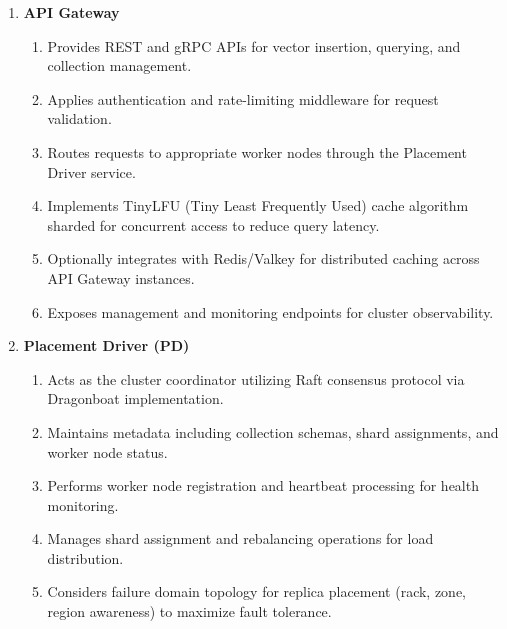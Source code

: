 \begin{enumerate}
    \item \textbf{API Gateway}
    \begin{enumerate}
        \item Provides REST and gRPC APIs for vector insertion, querying, and collection management.
        \item Applies authentication and rate-limiting middleware for request validation.
        \item Routes requests to appropriate worker nodes through the Placement Driver service.
        \item Implements TinyLFU (Tiny Least Frequently Used) cache algorithm sharded for concurrent access to reduce query latency.
        \item Optionally integrates with Redis/Valkey for distributed caching across API Gateway instances.
        \item Exposes management and monitoring endpoints for cluster observability.
    \end{enumerate}

    \item \textbf{Placement Driver (PD)}
    \begin{enumerate}
        \item Acts as the cluster coordinator utilizing Raft consensus protocol via Dragonboat implementation.
        \item Maintains metadata including collection schemas, shard assignments, and worker node status.
        \item Performs worker node registration and heartbeat processing for health monitoring.
        \item Manages shard assignment and rebalancing operations for load distribution.
        \item Considers failure domain topology for replica placement (rack, zone, region awareness) to maximize fault tolerance.
    \end{enumerate}


\end{enumerate}
